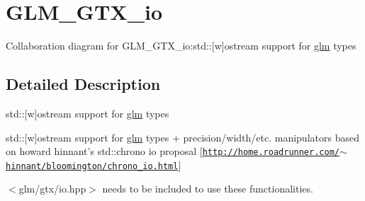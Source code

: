 \hypertarget{group__gtx__io}{
\section{GLM\_\-GTX\_\-io}
\label{group__gtx__io}
}


Collaboration diagram for GLM\_\-GTX\_\-io:std::\mbox{[}w\mbox{]}ostream support for \hyperlink{namespaceglm}{glm} types  


\subsection{Detailed Description}
std::\mbox{[}w\mbox{]}ostream support for \hyperlink{namespaceglm}{glm} types 

std::\mbox{[}w\mbox{]}ostream support for \hyperlink{namespaceglm}{glm} types + precision/width/etc. manipulators based on howard hinnant's std::chrono io proposal \mbox{[}\href{http://home.roadrunner.com/~hinnant/bloomington/chrono_io.html}{\tt http://home.roadrunner.com/$\sim$hinnant/bloomington/chrono\_\-io.html}\mbox{]}

$<$glm/gtx/io.hpp$>$ needs to be included to use these functionalities. 
